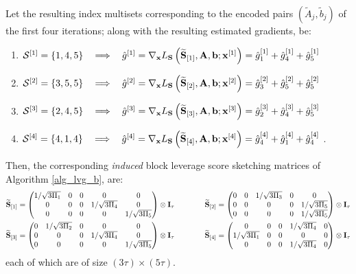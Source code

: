\documentclass[journal,letterpaper,onecolumn,twoside,nofonttune]{IEEEtran}
\newcommand{\Scal}{\mathcal{S}}
\newcommand{\bb}{\bold{b}}
\newcommand{\xb}{\bold{x}}
\newcommand{\Ab}{\bold{A}}
\newcommand{\Ib}{\bold{I}}
\newcommand{\Sb}{\bold{S}}
\newcommand{\Sbwt}{\widetilde{\Sb}}
\newcommand{\At}{\tilde{A}}
\newcommand{\bt}{\tilde{b}}
\newcommand{\gh}{\hat{g}}
\begin{document}
Let the resulting index multisets corresponding to the encoded pairs $(\At_j,\bt_j)$ of the first four iterations; along with the resulting estimated gradients, be:
\begin{enumerate}
  \item $\Scal^{[1]}=\{1,4,5\} \ \ \implies \ \ \gh^{[1]}=\nabla_\xb L_\Sb\left(\Sbwt_{[1]},\Ab,\bb;\xb^{[1]}\right)=\gh_1^{[1]}+\gh_4^{[1]}+\gh_5^{[1]}$
  \item $\Scal^{[2]}=\{3,5,5\} \ \ \implies \ \ \gh^{[2]}=\nabla_\xb L_\Sb\left(\Sbwt_{[2]},\Ab,\bb;\xb^{[2]}\right)=\gh_3^{[2]}+\gh_5^{[2]}+\gh_5^{[2]}$
  \item $\Scal^{[3]}=\{2,4,5\} \ \ \implies \ \ \gh^{[3]}=\nabla_\xb L_\Sb\left(\Sbwt_{[3]},\Ab,\bb;\xb^{[3]}\right)=\gh_2^{[3]}+\gh_4^{[3]}+\gh_5^{[3]}$
  \item $\Scal^{[4]}=\{4,1,4\} \ \ \implies \ \ \gh^{[4]}=\nabla_\xb L_\Sb\left(\Sbwt_{[4]},\Ab,\bb;\xb^{[4]}\right)=\gh_4^{[4]}+\gh_1^{[4]}+\gh_4^{[4]}\ $.
\end{enumerate}
Then, the corresponding \textit{induced} block leverage score sketching matrices of Algorithm \ref{alg_lvg_b}, are:
\begin{align*}
  \Sbwt_{[1]} &= \begin{pmatrix} 1/\sqrt{3\Pi_1} & 0 & 0 & 0 & 0 \\ 0 & 0 & 0 & 1/\sqrt{3\Pi_4} & 0 \\ 0 & 0 & 0 & 0 & 1/\sqrt{3\Pi_5} \end{pmatrix} \otimes\Ib_\tau \qquad \qquad \Sbwt_{[2]} = \begin{pmatrix} 0 & 0 & 1/\sqrt{3\Pi_3} & 0 & 0 \\ 0 & 0 & 0 & 0 & 1/\sqrt{3\Pi_5} \\ 0 & 0 & 0 & 0 & 1/\sqrt{3\Pi_5} \end{pmatrix}\otimes\Ib_\tau\\
  \Sbwt_{[3]} &= \begin{pmatrix} 0 & 1/\sqrt{3\Pi_2} & 0 & 0 & 0 \\ 0 & 0 & 0 & 1/\sqrt{3\Pi_4} & 0 \\ 0 & 0 & 0 & 0 & 1/\sqrt{3\Pi_5} \end{pmatrix}\otimes\Ib_\tau \qquad \qquad \Sbwt_{[4]} = \begin{pmatrix} 0 & 0 & 0 & 1/\sqrt{3\Pi_4} & 0 \\ 1/\sqrt{3\Pi_1} & 0 & 0 & 0 & 0 \\  0 & 0 & 0 & 1/\sqrt{3\Pi_4} & 0 \end{pmatrix}\otimes\Ib_\tau
\end{align*}
each of which are of size $(3\tau)\times(5\tau)$.
\end{document}
